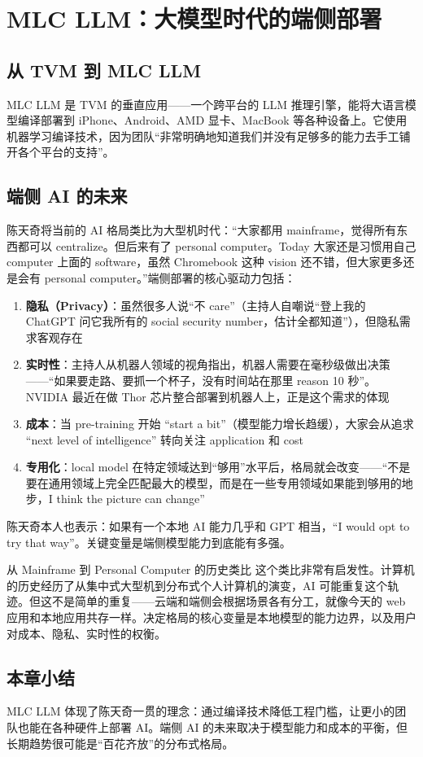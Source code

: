 \section{MLC LLM：大模型时代的端侧部署}

\subsection{从 TVM 到 MLC LLM}

MLC LLM 是 TVM 的垂直应用------一个跨平台的 LLM 推理引擎，能将大语言模型编译部署到 iPhone、Android、AMD 显卡、MacBook 等各种设备上。它使用机器学习编译技术，因为团队``非常明确地知道我们并没有足够多的能力去手工铺开各个平台的支持''。

\subsection{端侧 AI 的未来}

陈天奇将当前的 AI 格局类比为大型机时代：``大家都用 mainframe，觉得所有东西都可以 centralize。但后来有了 personal computer。Today 大家还是习惯用自己 computer 上面的 software，虽然 Chromebook 这种 vision 还不错，但大家更多还是会有 personal computer。''端侧部署的核心驱动力包括：

\begin{enumerate}
    \item \textbf{隐私（Privacy）}：虽然很多人说``不 care''（主持人自嘲说``登上我的 ChatGPT 问它我所有的 social security number，估计全都知道''），但隐私需求客观存在
    \item \textbf{实时性}：主持人从机器人领域的视角指出，机器人需要在毫秒级做出决策------``如果要走路、要抓一个杯子，没有时间站在那里 reason 10 秒''。NVIDIA 最近在做 Thor 芯片整合部署到机器人上，正是这个需求的体现
    \item \textbf{成本}：当 pre-training 开始 ``start a bit''（模型能力增长趋缓），大家会从追求 ``next level of intelligence'' 转向关注 application 和 cost
    \item \textbf{专用化}：local model 在特定领域达到``够用''水平后，格局就会改变------``不是要在通用领域上完全匹配最大的模型，而是在一些专用领域如果能到够用的地步，I think the picture can change''
\end{enumerate}

陈天奇本人也表示：如果有一个本地 AI 能力几乎和 GPT 相当，``I would opt to try that way''。关键变量是端侧模型能力到底能有多强。

\begin{knowledgebox}{从 Mainframe 到 Personal Computer 的历史类比}
这个类比非常有启发性。计算机的历史经历了从集中式大型机到分布式个人计算机的演变，AI 可能重复这个轨迹。但这不是简单的重复------云端和端侧会根据场景各有分工，就像今天的 web 应用和本地应用共存一样。决定格局的核心变量是本地模型的能力边界，以及用户对成本、隐私、实时性的权衡。
\end{knowledgebox}

\subsection{本章小结}

MLC LLM 体现了陈天奇一贯的理念：通过编译技术降低工程门槛，让更小的团队也能在各种硬件上部署 AI。端侧 AI 的未来取决于模型能力和成本的平衡，但长期趋势很可能是``百花齐放''的分布式格局。

